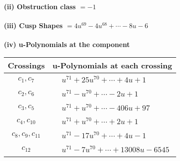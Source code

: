 \documentclass[1p]{elsarticle_modified}
\theoremstyle{definition}
\begin{document}
\flushleft \textbf{(ii) Obstruction class $= -1$}\\~\\
\flushleft \textbf{(iii) Cusp Shapes $= 4 u^{69}-4 u^{68}+\cdots-8 u-6$}\\~\\
\newpage\renewcommand{\arraystretch}{1}
\flushleft \textbf{(iv) u-Polynomials at the component}\newline \\
\begin{tabular}{m{50pt}|m{274pt}}
Crossings & \hspace{64pt}u-Polynomials at each crossing \\
\hline $$\begin{aligned}c_{1},c_{7}\end{aligned}$$&$\begin{aligned}
&u^{71}+25 u^{70}+\cdots+4 u+1
\end{aligned}$\\
\hline $$\begin{aligned}c_{2},c_{6}\end{aligned}$$&$\begin{aligned}
&u^{71}- u^{70}+\cdots-2 u+1
\end{aligned}$\\
\hline $$\begin{aligned}c_{3},c_{5}\end{aligned}$$&$\begin{aligned}
&u^{71}+u^{70}+\cdots-406 u+97
\end{aligned}$\\
\hline $$\begin{aligned}c_{4},c_{10}\end{aligned}$$&$\begin{aligned}
&u^{71}+u^{70}+\cdots+2 u+1
\end{aligned}$\\
\hline $$\begin{aligned}c_{8},c_{9},c_{11}\end{aligned}$$&$\begin{aligned}
&u^{71}-17 u^{70}+\cdots+4 u-1
\end{aligned}$\\
\hline $$\begin{aligned}c_{12}\end{aligned}$$&$\begin{aligned}
&u^{71}-7 u^{70}+\cdots+13008 u-6545
\end{aligned}$\\
\hline
\end{tabular}\\~\\
\end{document}
